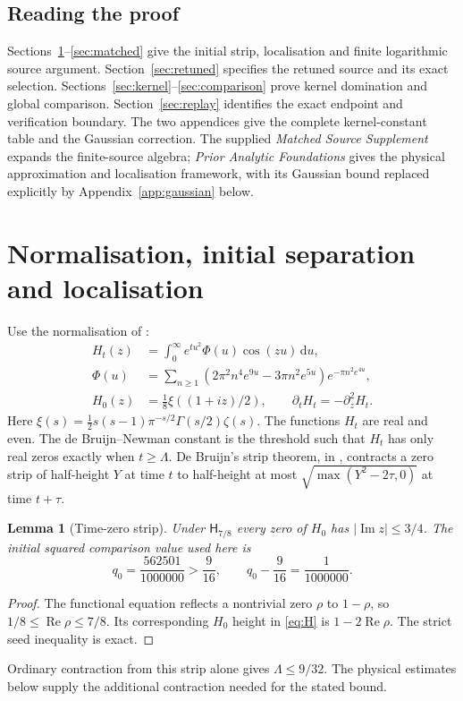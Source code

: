\documentclass[11pt,a4paper]{article}
\newtheorem{lemma}[theorem]{Lemma}
\theoremstyle{definition}\newtheorem{definition}[theorem]{Definition}
\theoremstyle{remark}\newtheorem{remark}[theorem]{Remark}
\newcommand{\HH}{\mathsf H}
\newcommand{\Rea}{\operatorname{Re}}
\newcommand{\Ima}{\operatorname{Im}}
\newcommand{\dd}{\mathrm d}
\begin{document}
\subsection{Reading the proof}
Sections~\ref{sec:norm}--\ref{sec:matched} give the initial strip,
localisation and finite logarithmic source argument.
Section~\ref{sec:retuned} specifies the retuned source and its exact
selection. Sections~\ref{sec:kernel}--\ref{sec:comparison} prove kernel
domination and global comparison. Section~\ref{sec:replay} identifies the
exact endpoint and verification boundary. The two appendices give the
complete kernel-constant table and the Gaussian correction.
The supplied \emph{Matched Source Supplement} expands the finite-source
algebra; \emph{Prior Analytic Foundations} gives the physical approximation
and localisation framework, with its Gaussian bound replaced explicitly
by Appendix~\ref{app:gaussian} below.

\section{Normalisation, initial separation and localisation}\label{sec:norm}
Use the normalisation of \cite{polymath}:
\begin{align}
H_t(z)&=\int_0^\infty e^{tu^2}\Phi(u)\cos(zu)\,\dd u,\label{eq:H}\\
\Phi(u)&=\sum_{n\ge1}(2\pi^2n^4e^{9u}-3\pi n^2e^{5u})
 e^{-\pi n^2e^{4u}},\nonumber\\
H_0(z)&=\tfrac18\xi((1+iz)/2),\qquad
\partial_t H_t=-\partial_z^2H_t.\nonumber
\end{align}
Here $\xi(s)=\tfrac12s(s-1)\pi^{-s/2}\Gamma(s/2)\zeta(s)$.
The functions $H_t$ are real and even. The de Bruijn--Newman constant is the
threshold such that $H_t$ has only real zeros exactly when $t\ge\Lambda$.
De Bruijn's strip theorem, in \cite[Theorem 3.2]{polymath}, contracts a
zero strip of half-height $Y$ at time $t$ to half-height at most
$\sqrt{\max(Y^2-2\tau,0)}$ at time $t+\tau$.

\begin{lemma}[Time-zero strip]\label{lem:initial}
Under $\HH_{7/8}$ every zero of $H_0$ has $|\Ima z|\le3/4$.
The initial squared comparison value used here is
\begin{equation}\label{eq:q0}
q_0=\frac{562501}{1000000}>\frac9{16},\qquad
q_0-\frac9{16}=\frac1{1000000}.
\end{equation}
\end{lemma}
\begin{proof}
The functional equation reflects a nontrivial zero $\rho$ to $1-\rho$,
so $1/8\le\Rea\rho\le7/8$. Its corresponding $H_0$ height in
\eqref{eq:H} is $1-2\Rea\rho$. The strict seed inequality is exact.
\end{proof}
Ordinary contraction from this strip alone gives $\Lambda\le9/32$.
The physical estimates below supply the additional contraction needed for
the stated bound.
\end{document}
